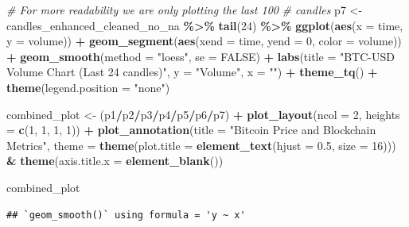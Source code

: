 \documentclass[
]{article}
\newenvironment{Shaded}{\begin{snugshade}}{\end{snugshade}}
\newcommand{\AttributeTok}[1]{\textcolor[rgb]{0.13,0.29,0.53}{#1}}
\newcommand{\CommentTok}[1]{\textcolor[rgb]{0.56,0.35,0.01}{\textit{#1}}}
\newcommand{\ConstantTok}[1]{\textcolor[rgb]{0.56,0.35,0.01}{#1}}
\newcommand{\DecValTok}[1]{\textcolor[rgb]{0.00,0.00,0.81}{#1}}
\newcommand{\FloatTok}[1]{\textcolor[rgb]{0.00,0.00,0.81}{#1}}
\newcommand{\FunctionTok}[1]{\textcolor[rgb]{0.13,0.29,0.53}{\textbf{#1}}}
\newcommand{\NormalTok}[1]{#1}
\newcommand{\OtherTok}[1]{\textcolor[rgb]{0.56,0.35,0.01}{#1}}
\newcommand{\SpecialCharTok}[1]{\textcolor[rgb]{0.81,0.36,0.00}{\textbf{#1}}}
\newcommand{\StringTok}[1]{\textcolor[rgb]{0.31,0.60,0.02}{#1}}
\begin{document}
\begin{Shaded}
\begin{Highlighting}[]
\CommentTok{\# For more readability we are only plotting the last 100}
\CommentTok{\# candles}
\NormalTok{p7 }\OtherTok{\textless{}{-}}\NormalTok{ candles\_enhanced\_cleaned\_no\_na }\SpecialCharTok{\%\textgreater{}\%}
    \FunctionTok{tail}\NormalTok{(}\DecValTok{24}\NormalTok{) }\SpecialCharTok{\%\textgreater{}\%}
    \FunctionTok{ggplot}\NormalTok{(}\FunctionTok{aes}\NormalTok{(}\AttributeTok{x =}\NormalTok{ time, }\AttributeTok{y =}\NormalTok{ volume)) }\SpecialCharTok{+} \FunctionTok{geom\_segment}\NormalTok{(}\FunctionTok{aes}\NormalTok{(}\AttributeTok{xend =}\NormalTok{ time,}
    \AttributeTok{yend =} \DecValTok{0}\NormalTok{, }\AttributeTok{color =}\NormalTok{ volume)) }\SpecialCharTok{+} \FunctionTok{geom\_smooth}\NormalTok{(}\AttributeTok{method =} \StringTok{"loess"}\NormalTok{,}
    \AttributeTok{se =} \ConstantTok{FALSE}\NormalTok{) }\SpecialCharTok{+} \FunctionTok{labs}\NormalTok{(}\AttributeTok{title =} \StringTok{"BTC{-}USD Volume Chart (Last 24 candles)"}\NormalTok{,}
    \AttributeTok{y =} \StringTok{"Volume"}\NormalTok{, }\AttributeTok{x =} \StringTok{""}\NormalTok{) }\SpecialCharTok{+} \FunctionTok{theme\_tq}\NormalTok{() }\SpecialCharTok{+} \FunctionTok{theme}\NormalTok{(}\AttributeTok{legend.position =} \StringTok{"none"}\NormalTok{)}

\NormalTok{combined\_plot }\OtherTok{\textless{}{-}}\NormalTok{ (p1}\SpecialCharTok{/}\NormalTok{p2}\SpecialCharTok{/}\NormalTok{p3}\SpecialCharTok{/}\NormalTok{p4}\SpecialCharTok{/}\NormalTok{p5}\SpecialCharTok{/}\NormalTok{p6}\SpecialCharTok{/}\NormalTok{p7) }\SpecialCharTok{+} \FunctionTok{plot\_layout}\NormalTok{(}\AttributeTok{ncol =} \DecValTok{2}\NormalTok{,}
    \AttributeTok{heights =} \FunctionTok{c}\NormalTok{(}\DecValTok{1}\NormalTok{, }\DecValTok{1}\NormalTok{, }\DecValTok{1}\NormalTok{, }\DecValTok{1}\NormalTok{)) }\SpecialCharTok{+} \FunctionTok{plot\_annotation}\NormalTok{(}\AttributeTok{title =} \StringTok{"Bitcoin Price and Blockchain Metrics"}\NormalTok{,}
    \AttributeTok{theme =} \FunctionTok{theme}\NormalTok{(}\AttributeTok{plot.title =} \FunctionTok{element\_text}\NormalTok{(}\AttributeTok{hjust =} \FloatTok{0.5}\NormalTok{, }\AttributeTok{size =} \DecValTok{16}\NormalTok{))) }\SpecialCharTok{\&}
    \FunctionTok{theme}\NormalTok{(}\AttributeTok{axis.title.x =} \FunctionTok{element\_blank}\NormalTok{())}

\NormalTok{combined\_plot}
\end{Highlighting}
\end{Shaded}

\begin{verbatim}
## `geom_smooth()` using formula = 'y ~ x'
\end{verbatim}
\end{document}
